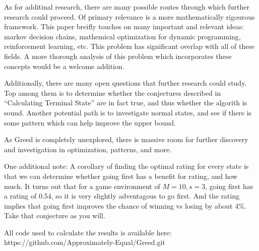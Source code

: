 \documentclass[a4paper]{article}
\begin{document}

As for additinal research, there are many possible routes through which further research could proceed. Of primary relevance is a more mathematically rigourous framework. This paper breifly touches on many important and relevant ideas: markov decision chains, mathemical optimization for dynamic programming, reinforcement learning, etc. This problem has significant overlap with all of these fields. A more thorough analysis of this problem which incorporates these concepts would be a welcome addition.

Additionally, there are many open questions that further research could study. Top among them is to determine whether the conjectures described in ``Calculating Terminal State'' are in fact true, and thus whether the algorith is sound. Another potential path is to investigate normal states, and see if there is some pattern which can help improve the upper bound. 

As Greed is completely unexplored, there is massive room for further discovery and investigation in optimization, patterns, and more.


One additional note: A corollary of finding the optimal rating for every state is that we can determine whether going first has a benefit for rating, and how much. It turns out that for a game environment of $M = 10, s = 3$, going first has a rating of $0.54$, so it is very slightly adventagous to go first. And the rating implies that going first improves the chance of winning vs losing by about 4\%. Take that conjecture as you will.


All code used to calculate the results is available here: https://github.com/Approximately-Equal/Greed.git

\end{document}
